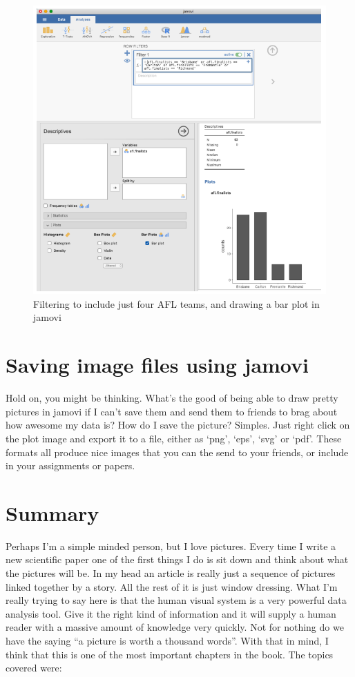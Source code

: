 \documentclass[
]{book}
\begin{document}
\begin{figure}
\includegraphics[width=0.9\linewidth]{images/Figure32} \caption{Filtering to include just four AFL teams, and drawing a bar plot in jamovi}\label{fig:fig5-11}
\end{figure}

\hypertarget{saving-image-files-using-jamovi}{%
\section{Saving image files using jamovi}\label{saving-image-files-using-jamovi}}

Hold on, you might be thinking. What's the good of being able to draw pretty pictures in jamovi if I can't save them and send them to friends to brag about how awesome my data is? How do I save the picture? Simples. Just right click on the plot image and export it to a file, either as `png', `eps', `svg' or `pdf'. These formats all produce nice images that you can the send to your friends, or include in your assignments or papers.

\hypertarget{summary-3}{%
\section{Summary}\label{summary-3}}

Perhaps I'm a simple minded person, but I love pictures. Every time I write a new scientific paper one of the first things I do is sit down and think about what the pictures will be. In my head an article is really just a sequence of pictures linked together by a story. All the rest of it is just window dressing. What I'm really trying to say here is that the human visual system is a very powerful data analysis tool. Give it the right kind of information and it will supply a human reader with a massive amount of knowledge very quickly. Not for nothing do we have the saying ``a picture is worth a thousand words''. With that in mind, I think that this is one of the most important chapters in the book. The topics covered were:
\end{document}
